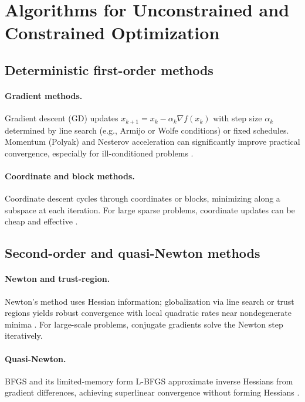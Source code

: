 \section{Algorithms for Unconstrained and Constrained Optimization}
\label{sec:methods}

\subsection{Deterministic first-order methods}
\paragraph{Gradient methods.} Gradient descent (GD) updates $x_{k+1}=x_k-\alpha_k\nabla f(x_k)$ with step size $\alpha_k$ determined by line search (e.g., Armijo or Wolfe conditions) or fixed schedules. Momentum (Polyak) and Nesterov acceleration can significantly improve practical convergence, especially for ill-conditioned problems \cite{nesterov2004introductory}.

\paragraph{Coordinate and block methods.} Coordinate descent cycles through coordinates or blocks, minimizing along a subspace at each iteration. For large sparse problems, coordinate updates can be cheap and effective \cite{wright2015coordinate}.

\subsection{Second-order and quasi-Newton methods}
\paragraph{Newton and trust-region.} Newton's method uses Hessian information; globalization via line search or trust regions yields robust convergence with local quadratic rates near nondegenerate minima \cite{nocedal2006numerical,more1983computing}. For large-scale problems, conjugate gradients solve the Newton step iteratively.

\paragraph{Quasi-Newton.} BFGS and its limited-memory form L-BFGS approximate inverse Hessians from gradient differences, achieving superlinear convergence without forming Hessians \cite{liu1989lbfgs,broyden1970convergence,fletcher1970new,goldfarb1970family,shanno1970conditioning}.

